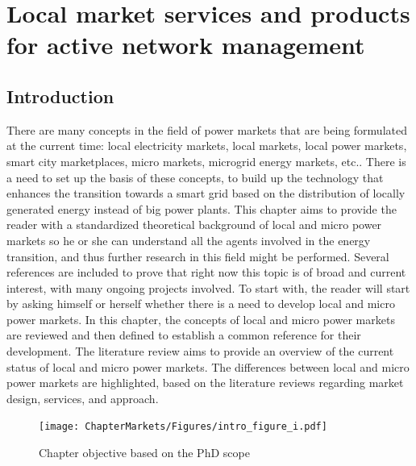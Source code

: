 \renewcommand\labelenumi{(\roman{enumi})}
\renewcommand\theenumi\labelenumi

\chapter{Local market services and products for active network management}
\label{chapterMarkets}

\section{Introduction}
There are many concepts in the field of power markets that are being formulated at the current time: local electricity markets, local markets, local power markets, smart city marketplaces, micro markets, microgrid energy markets, etc.. There is a need to set up the basis of these concepts, to build up the technology that enhances the transition towards a smart grid based on the distribution of locally generated energy instead of big power plants.
This chapter aims to provide the reader with a standardized theoretical background of local and micro power markets so he or she can understand all the agents involved in the energy transition, and thus further research in this field might be performed. Several references are included to prove that right now this topic is of broad and current interest, with many ongoing projects involved.
To start with, the reader will start by asking himself or herself whether there is a need to develop local and micro power markets.
In this chapter, the concepts of local and micro power markets are reviewed and then defined to establish a common reference for their development. The literature review aims to provide an overview of the current status of local and micro power markets. The differences between local and micro power markets are highlighted, based on the literature reviews regarding market design, services, and approach.

\begin{figure}[htbp]
	\centering
	\texttt{[image: ChapterMarkets/Figures/intro\_figure\_i.pdf]}
		\caption{Chapter objective based on the PhD scope}
	\label{fig:chapter_obj}  
\end{figure}

